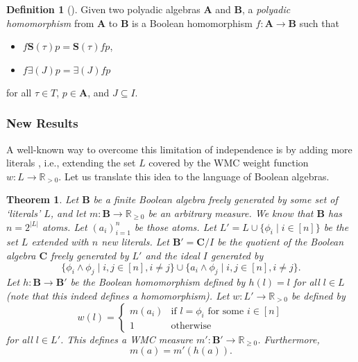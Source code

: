 \documentclass{article}
\newtheorem{theorem}{Theorem}
\theoremstyle{definition}
\newtheorem{definition}{Definition}
\theoremstyle{remark}
\begin{document}
\begin{definition}[\cite{halmos2016algebraic}]
  Given two polyadic algebras $\mathbf{A}$ and $\mathbf{B}$, a \emph{polyadic
    homomorphism} from $\mathbf{A}$ to $\mathbf{B}$ is a Boolean homomorphism $f
  : \mathbf{A} \to \mathbf{B}$ such that
  \begin{itemize}
  \item $f\mathbf{S}(\tau)p = \mathbf{S}(\tau)fp$,
  \item $f\bm\exists(J)p = \bm\exists(J)fp$
  \end{itemize}
  for all $\tau \in T$, $p \in \mathbf{A}$, and $J \subseteq I$.
\end{definition}

\subsubsection{New Results}

A well-known way to overcome this limitation of independence is by adding more
literals \cite{DBLP:journals/ai/ChaviraD08}, i.e., extending the set $L$ covered
by the WMC weight function $w : L \to \mathbb{R}_{>0}$. Let us translate this
idea to the language of Boolean algebras.

\begin{theorem} \label{thm:extension} %
  Let $\mathbf{B}$ be a finite Boolean algebra freely generated by some set of
  `literals' $L$, and let $m : \mathbf{B} \to \mathbb{R}_{\ge 0}$ be an
  arbitrary measure. We know that $\mathbf{B}$ has $n = 2^{|L|}$ atoms. Let
  $(a_i)_{i=1}^n$ be those atoms. Let $L' = L \cup \{ \phi_i \mid i \in [n] \}$
  be the set $L$ extended with $n$ new literals. Let $\mathbf{B'} =
  \mathbf{C}/I$ be the quotient of the Boolean algebra $\mathbf{C}$ freely
  generated by $L'$ and the ideal $I$ generated by
  \[
    \{\phi_i \land \phi_j \mid i, j \in [n], i \ne j \} \cup \{ a_i \land \phi_j
    \mid i, j \in [n], i \ne j \}.
  \]
  Let $h : \mathbf{B} \to \mathbf{B'}$ be the Boolean homomorphism defined by
  $h(l) = l$ for all $l \in L$ (note that this indeed defines a homomorphism).
  Let $w : L' \to \mathbb{R}_{> 0}$ be defined by
  \[
    w(l) = \begin{cases}
      m(a_i) & \text{if } l = \phi_i \text{ for some } i \in [n] \\
      1 & \text{otherwise}
    \end{cases}
  \]
  for all $l \in L'$. This defines a WMC measure $m' : \mathbf{B'} \to
  \mathbb{R}_{\ge 0}$. Furthermore,
  \[
    m(a) = m'(h(a)).
  \]
\end{theorem}
\end{document}
